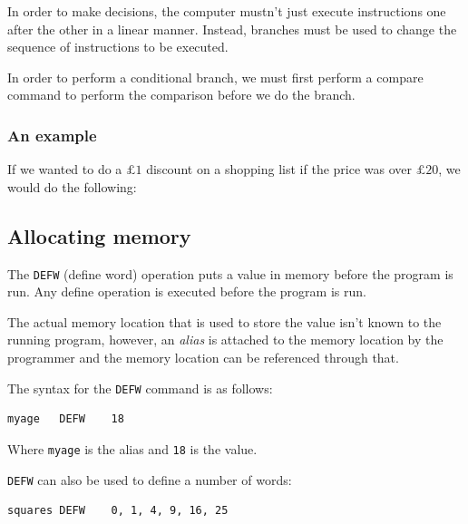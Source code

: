 In order to make decisions, the computer mustn't just execute instructions one
after the other in a linear manner. Instead, branches must be used to change the
sequence of instructions to be executed.

In order to perform a conditional branch, we must first perform a compare
command to perform the comparison before we do the branch.

\subsubsection{An example}

If we wanted to do a $£1$ discount on a shopping list if the price was over
$£20$, we would do the following:


\subsection{Allocating memory}

The \texttt{DEFW} (define word) operation puts a value in memory before the
program is run. Any define operation is executed before the program is run.

The actual memory location that is used to store the value isn't known to the
running program, however, an {\it alias} is attached to the memory location by
the programmer and the memory location can be referenced through that.

The syntax for the \texttt{DEFW} command is as follows:

\begin{verbatim}
myage	DEFW	18
\end{verbatim}

Where {\tt myage} is the alias and {\tt 18} is the value.

{\tt DEFW} can also be used to define a number of words:

\begin{verbatim}
squares	DEFW	0, 1, 4, 9, 16, 25
\end{verbatim}

